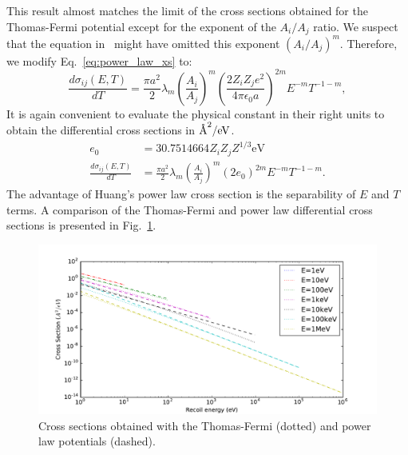 \documentclass[review]{elsarticle}
\newcommand{\angstrom}{\text{\normalfont\AA}}
\begin{document}
This result almost matches the limit of the cross sections obtained for the Thomas-Fermi potential except for the exponent of the $A_i/A_j$ ratio. We suspect that the equation in~\cite{Huang1993} might have omitted this exponent $(A_i/A_j)^m$. Therefore, we modify Eq.~\ref{eq:power_law_xs} to:
\begin{equation}
     \frac{d \sigma_{ij}(E,T)}{dT} = \frac{\pi a^2}{2} \lambda_m \left(\frac{A_i}{A_j}\right)^m \left( \frac{2 Z_i Z_j e^2}{4 \pi \epsilon_0 a} \right)^{2m} E^{-m}T^{-1-m},
\end{equation}
It is again convenient to evaluate the physical constant in their right units to obtain the differential cross sections in $\angstrom^2/\text{eV}$.
\begin{align}
   e_0 &=  30.7514664  Z_i  Z_j  Z^{1/3}  \text{eV} \nonumber \\ 
   \frac{d \sigma_{ij}(E,T)}{dT} &= \frac{\pi a^2}{2} \lambda_m \left(\frac{A_i}{A_j}\right)^m \left(2 e_0 \right)^{2m} E^{-m}T^{-1-m}.
\end{align}
The advantage of Huang's power law cross section is the separability of $E$ and $T$ terms. A comparison of the Thomas-Fermi and power law differential cross sections is presented in Fig.~\ref{fig:thomas_fermi_vs_power}.

\begin{figure}
	\centering
	\includegraphics[width=1\linewidth]{thomas_fermi_vs_power.pdf}
	\caption{Cross sections obtained with the Thomas-Fermi (dotted) and power law potentials (dashed).}
	\label{fig:thomas_fermi_vs_power}
\end{figure}
\end{document}
